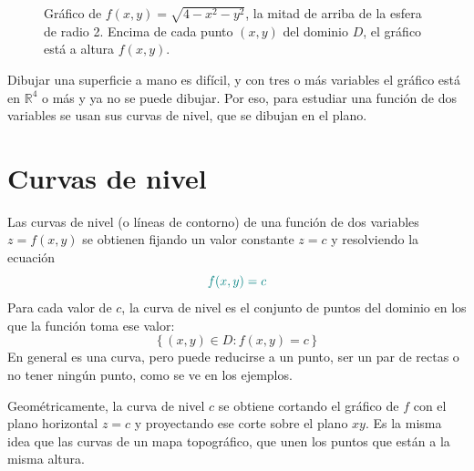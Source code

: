 \documentclass{article}
\newcommand{\R}{\ensuremath{\mathbb{R}}}
\begin{document}
\begin{figure}[H]
    \caption{Gráfico de \(f(x,y)=\sqrt{4-x^2-y^2}\), la mitad de arriba de la esfera de radio 2. Encima de cada punto \((x,y)\) del dominio \(D\), el gráfico está a altura \(f(x,y)\).}
\end{figure}

Dibujar una superficie a mano es difícil, y con tres o más variables el gráfico está en \(\R^4\) o más y ya no se puede dibujar. Por eso, para estudiar una función de dos variables se usan sus curvas de nivel, que se dibujan en el plano.

\section*{Curvas de nivel}

Las curvas de nivel (o líneas de contorno) de una función de dos variables \(z=f(x,y)\) se obtienen fijando un valor constante \(z=c\) y resolviendo la ecuación
\[
\color{teal} f(x,y)=c
\]
{\color{teal}Para cada valor de \(c\), la curva de nivel es el conjunto de puntos del dominio en los que la función toma ese valor:
\[
\{\,(x,y)\in D : f(x,y)=c\,\}
\]}%
En general es una curva, pero puede reducirse a un punto, ser un par de rectas o no tener ningún punto, como se ve en los ejemplos.

Geométricamente, la curva de nivel \(c\) se obtiene cortando el gráfico de \(f\) con el plano horizontal \(z=c\) y proyectando ese corte sobre el plano \(xy\). Es la misma idea que las curvas de un mapa topográfico, que unen los puntos que están a la misma altura.
\end{document}
